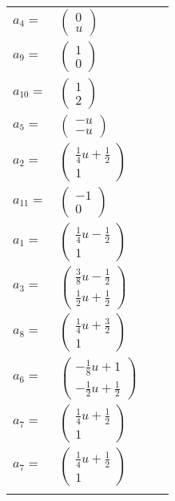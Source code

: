 \documentclass[1p]{elsarticle_modified}
\theoremstyle{definition}
\begin{document}
\begin{tabular}{m{7pt} m{180pt} m{7pt} m{180pt} }
\flushright $a_{4}=$&$\begin{pmatrix}0\\u\end{pmatrix}$ \\
\flushright $a_{9}=$&$\begin{pmatrix}1\\0\end{pmatrix}$ \\
\flushright $a_{10}=$&$\begin{pmatrix}1\\2\end{pmatrix}$ \\
\flushright $a_{5}=$&$\begin{pmatrix}- u\\- u\end{pmatrix}$ \\
\flushright $a_{2}=$&$\begin{pmatrix}\frac{1}{4} u+\frac{1}{2}\\1\end{pmatrix}$ \\
\flushright $a_{11}=$&$\begin{pmatrix}-1\\0\end{pmatrix}$ \\
\flushright $a_{1}=$&$\begin{pmatrix}\frac{1}{4} u-\frac{1}{2}\\1\end{pmatrix}$ \\
\flushright $a_{3}=$&$\begin{pmatrix}\frac{3}{8} u-\frac{1}{2}\\\frac{1}{2} u+\frac{1}{2}\end{pmatrix}$ \\
\flushright $a_{8}=$&$\begin{pmatrix}\frac{1}{4} u+\frac{3}{2}\\1\end{pmatrix}$ \\
\flushright $a_{6}=$&$\begin{pmatrix}-\frac{1}{8} u+1\\-\frac{1}{2} u+\frac{1}{2}\end{pmatrix}$ \\
\flushright $a_{7}=$&$\begin{pmatrix}\frac{1}{4} u+\frac{1}{2}\\1\end{pmatrix}$\\ \flushright $a_{7}=$&$\begin{pmatrix}\frac{1}{4} u+\frac{1}{2}\\1\end{pmatrix}$\\&\end{tabular}
\end{document}
